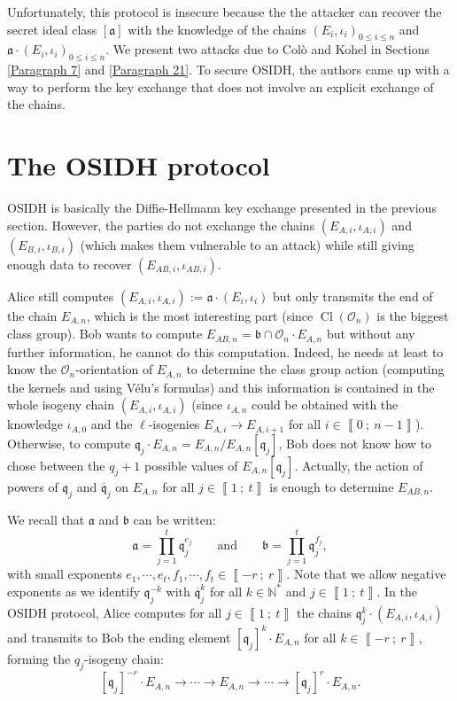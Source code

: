 \documentclass[a4paper,10pt,notitlepage]{report}
\theoremstyle{definition}
\theoremstyle{plain}
\theoremstyle{definition}
\newcommand{\N}{\mathbb{N}}
\newcommand{\mO}{\mathcal{O}}
\renewcommand{\i}[2]{\left\llbracket #1~;~#2\right\rrbracket}
\renewcommand{\(}{\left(}
\renewcommand{\)}{\right)}
\newcommand{\mf}[1]{\mathfrak{#1}}
\newcommand{\mfq}{\mathfrak{q}}
\DeclareMathOperator{\Cl}{Cl}
\begin{document}
Unfortunately, this protocol is insecure because the the attacker can recover the secret ideal class $[\mf{a}]$ with the knowledge of the chains $(E_i,\iota_i)_{0\leq i\leq n}$ and $\mf{a}\cdot(E_i,\iota_i)_{0\leq i\leq n}$.  We present two attacks due to Col\`{o} and Kohel \cite[§ 5.1]{OSIDH} in Sections \ref{Paragraph 7} and \ref{Paragraph 21}.  To secure OSIDH, the authors came up with a way to perform the key exchange that does not involve an explicit exchange of the chains.

\section{The OSIDH protocol}\label{Paragraph 8}

OSIDH is basically the Diffie-Hellmann key exchange presented in the previous section. However,  the parties do not exchange the chains $(E_{A,i},\iota_{A,i})$ and $(E_{B,i},\iota_{B,i})$ (which makes them vulnerable to an attack) while still giving enough data to recover $(E_{AB,i},\iota_{AB,i})$.  

Alice still computes $(E_{A,i},\iota_{A,i}):=\mf{a}\cdot (E_i,\iota_i)$ but only transmits the end of the chain $E_{A,n}$, which is the most interesting part (since $\Cl(\mO_n)$ is the biggest class group).  Bob wants to compute $E_{AB,n}=\mf{b}\cap\mO_n\cdot E_{A,n}$ but without any further information, he cannot do this computation. Indeed, he needs at least to know the $\mO_n$-orientation of $E_{A,n}$ to determine the class group action (computing the kernels and using V\'{e}lu's formulas) and this information is contained in the whole isogeny chain $(E_{A,i},\iota_{A,i})$ (since $\iota_{A,n}$ could be obtained with the knowledge $\iota_{A,0}$ and the $\ell$-isogenies $E_{A,i}\longrightarrow E_{A,i+1}$ for all $i\in\i{0}{n-1}$). Otherwise, to compute $\mfq_j\cdot E_{A,n}=E_{A,n}/E_{A,n}[\mfq_j]$, Bob does not know how to chose between the $q_j+1$ possible values of $E_{A,n}[\mfq_j]$.  Actually, the action of powers of $\mfq_j$ and $\overline{\mfq}_j$ on $E_{A,n}$ for all $j\in\i{1}{t}$ is enough to determine $E_{AB,n}$.

We recall that $\mf{a}$ and $\mf{b}$ can be written:
\[\mf{a}=\prod_{j=1}^t \mf{q}_j^{e_j} \qquad \mbox{and} \qquad \mf{b}=\prod_{j=1}^t \mf{q}_j^{f_j},\]
with small exponents $e_1,\cdots,e_t, f_1,\cdots,f_t\in\i{-r}{r}$.  Note that we allow negative exponents as we identify $\mf{q}_j^{-k}$ with $\overline{\mf{q}}_j^{k}$ for all $k\in\N^*$ and $j\in\i{1}{t}$.  In the OSIDH protocol, Alice computes for all $j\in\i{1}{t}$ the chains $\mfq_j^k\cdot (E_{A,i},\iota_{A,i})$ and transmits to Bob the ending element $[\mfq_j]^k\cdot E_{A,n}$ for all $k\in\i{-r}{r}$, forming the $q_j$-isogeny chain:
\[[\mfq_j]^{-r}\cdot E_{A,n}\longrightarrow \cdots \longrightarrow E_{A,n}\longrightarrow \cdots\longrightarrow [\mfq_j]^{r}\cdot E_{A,n}.\]
\end{document}
